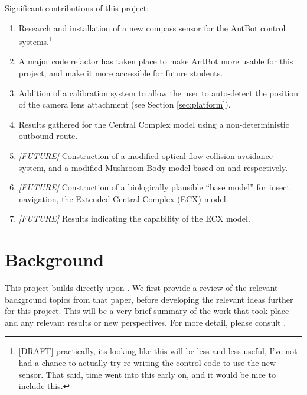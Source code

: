 \documentclass[a4paper,11pt,twoside,openright]{article}
\let\oldsection\section
\def\section{\cleardoublepage\oldsection}
\begin{document}
Significant contributions of this project:
\begin{enumerate}
\item{
  Research and installation of a new compass sensor for the AntBot control
  systems.\footnote{[DRAFT] practically, its looking like this will be less
    and less useful, I've not had a chance to actually try re-writing the control
    code to use the new sensor. That said, time went into this early on, and it
    would be nice to include this.}
}

\item{
  A major code refactor has taken place to make AntBot more usable for this
  project, and make it more accessible for future students.
}

\item{
  Addition of a calibration system to allow the user to auto-detect the position
  of the camera lens attachment (see Section \ref{sec:platform}).
}

\item{
  Results gathered for the Central Complex model using a non-deterministic
  outbound route.
}

\item{
  \textit{[FUTURE]}
  Construction of a modified optical flow collision avoidance system, and a
  modified Mushroom Body model based on \cite{Mitchell2018} and \cite{Zhang2017}
  respectively.
}

\item{
  \textit{[FUTURE]} Construction of a biologically plausible ``base model'' for
  insect navigation, the Extended Central Complex (ECX) model.
}

\item{
  \textit{[FUTURE]} Results indicating the capability of the ECX model.
}
\end{enumerate}
\newpage

\section{ Background }
This project builds directly upon \cite{Mitchell2018}. We first provide a review
of the relevant background topics from that paper, before developing the relevant
ideas further for this project. This will be a very brief summary of the work
that took place and any relevant results or new perspectives. For more detail,
please consult \cite{Mitchell2018}.
\end{document}
